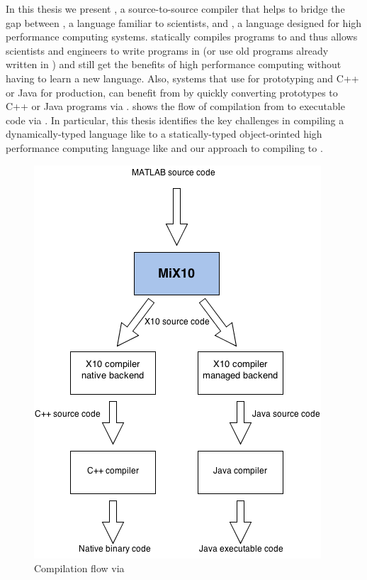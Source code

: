 In this thesis we present \mixten, a source-to-source compiler that helps
to bridge the gap between \matlab, a language familiar to scientists,
and \xten,  a language designed for high performance computing systems. 
\mixten statically compiles \matlab programs to \xten and thus
allows scientists and engineers to write programs in \matlab (or use old 
programs already written in \matlab) and still get the benefits of high 
performance computing without having to learn a new language. Also, systems that
use \matlab for prototyping and C++ or Java for production, can benefit from
\mixten by quickly converting \matlab prototypes to C++ or Java programs via 
\xten.  shows the flow of compilation from \matlab to
executable code via \mixten. In particular, this thesis identifies the key 
challenges in compiling a
dynamically-typed language like \matlab to a statically-typed object-orinted
high performance computing language like \xten and our approach to 
compiling \matlab to \xten.
\begin{figure}[htbp]                                                            
\begin{center}                                                                  
\includegraphics[scale=0.4]{images/mix10_compilation_flow}                             
\caption {Compilation flow via \mixten}\label{Fig:flow}                    
\end{center}                                                                    
\end{figure}     

